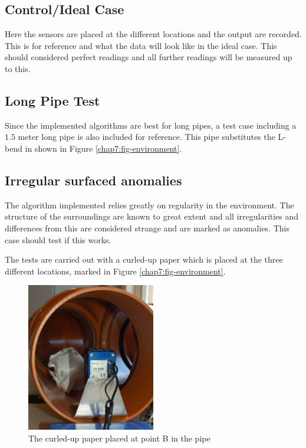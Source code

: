 \subsection{Control/Ideal Case}
Here the sensors are placed at the different locations and the output are recorded. This
is for reference and what the data will look like in the ideal case. This should
considered perfect readings and all further readings will be measured up to this.

\subsection{Long Pipe Test}
Since the implemented algorithms are best for long pipes, a test case including a
$1.5$ meter long pipe is also included for reference. This pipe substitutes the L-bend in
shown in Figure \ref{chap7:fig-environment}.


\subsection{Irregular surfaced anomalies}
The algorithm implemented relies greatly on regularity in the environment. The structure
of the surroundings are known to great extent and all irregularities and differences from
this are considered strange and are marked as anomalies. This case should test if this
works.

The tests are carried out with a curled-up paper which is placed at the three different
locations, marked in Figure \ref{chap7:fig-environment}. 
\begin{figure}[htbp]
    \centering
    \includegraphics[width=0.5\textwidth]{pics/irregularSR}
    \caption{The curled-up paper placed at point B in the pipe}
    \label{chap7:fig-culed-up-paper-at-B}
\end{figure}


